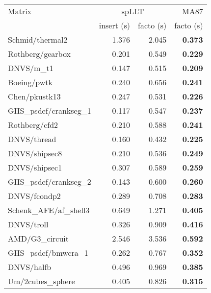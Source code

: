 \begin{tabular}{l|rr|r}
  \hline
  Matrix                          & \multicolumn{2}{c}{spLLT} & MA87                   \\
  \cline{2-4}
                                  & insert (s)                & facto (s) & facto (s)  \\
  \hline
  Schmid/thermal2                 & 1.376                     & 2.045     & \bf 0.373  \\
  Rothberg/gearbox                & 0.201                     & 0.549     & \bf 0.229  \\
  DNVS/m\_t1                      & 0.147                     & 0.515     & \bf 0.209  \\
  Boeing/pwtk                     & 0.240                     & 0.656     & \bf 0.241  \\
  Chen/pkustk13                   & 0.247                     & 0.531     & \bf 0.226  \\
  GHS\_psdef/crankseg\_1          & 0.117                     & 0.547     & \bf 0.237  \\
  Rothberg/cfd2                   & 0.210                     & 0.588     & \bf 0.241  \\
  DNVS/thread                     & 0.160                     & 0.432     & \bf 0.225  \\
  DNVS/shipsec8                   & 0.210                     & 0.536     & \bf 0.249  \\
  DNVS/shipsec1                   & 0.307                     & 0.589     & \bf 0.259  \\
  GHS\_psdef/crankseg\_2          & 0.143                     & 0.600     & \bf 0.260  \\
  DNVS/fcondp2                    & 0.289                     & 0.708     & \bf 0.283  \\
  Schenk\_AFE/af\_shell3          & 0.649                     & 1.271     & \bf 0.405  \\
  DNVS/troll                      & 0.326                     & 0.909     & \bf 0.416  \\
  AMD/G3\_circuit                 & 2.546                     & 3.536     & \bf 0.592  \\
  GHS\_psdef/bmwcra\_1            & 0.262                     & 0.767     & \bf 0.352  \\
  DNVS/halfb                      & 0.496                     & 0.969     & \bf 0.385  \\
  Um/2cubes\_sphere               & 0.405                     & 0.826     & \bf 0.315  \\

\end{tabular}
